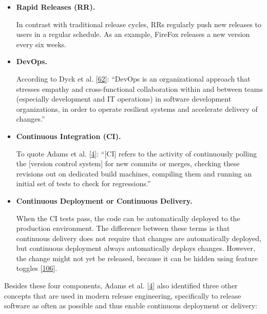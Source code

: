 \documentclass[]{book}
\begin{document}
\begin{itemize}
\item
  \textbf{Rapid Releases (RR).}

  In contrast with traditional release cycles, RRs regularly push new
  releases to users in a regular schedule. As an example, FireFox
  releases a new version every six weeks.
\item
  \textbf{DevOps.}

  According to Dyck et al. {[}\protect\hyperlink{ref-dyck2015a}{62}{]}:
  ``DevOps is an organizational approach that stresses empathy and
  cross-functional collaboration within and between teams (especially
  development and IT operations) in software development organizations,
  in order to operate resilient systems and accelerate delivery of
  changes.''
\item
  \textbf{Continuous Integration (CI).}

  To quote Adams et al. {[}\protect\hyperlink{ref-adams2016a}{4}{]}:
  ``{[}CI{]} refers to the activity of continuously polling the
  {[}version control system{]} for new commits or merges, checking these
  revisions out on dedicated build machines, compiling them and running
  an initial set of tests to check for regressions.''
\item
  \textbf{Continuous Deployment or Continuous Delivery.}

  When the CI tests pass, the code can be automatically deployed to the
  production environment. The difference between these terms is that
  continuous delivery does not require that changes are automatically
  deployed, but continuous deployment always automatically deploys
  changes. However, the change might not yet be released, because it can
  be hidden using feature toggles
  {[}\protect\hyperlink{ref-laukkanen2018a}{106}{]}.
\end{itemize}

Besides these four components, Adams et al.
{[}\protect\hyperlink{ref-adams2016a}{4}{]} also identified three other
concepts that are used in modern release engineering, specifically to
release software as often as possible and thus enable continuous
deployment or delivery:
\end{document}
